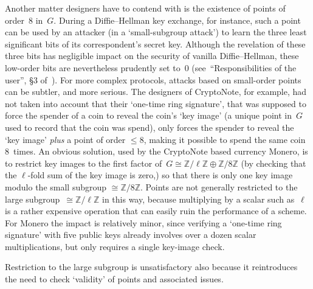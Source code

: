 \documentclass{amsproc}
\newcommand{\Z}{\mathbb{Z}}
\begin{document}
Another matter designers have to contend with
is the existence of points of order~$8$ in~$G$.
During a Diffie--Hellman key exchange, for instance,
such a point can be used by an attacker
(in a `small-subgroup attack')
to learn the three least significant
bits of its correspondent's secret key.
Although the revelation of these three bits has
negligible impact on the security of vanilla Diffie--Hellman,
these low-order bits are nevertheless prudently set to~$0$
(see~``Responsibilities of the user'', \S3 of~\cite{x25519}).
For more complex protocols,
attacks based on small-order points
can be subtler, and more serious.
The designers of CryptoNote\cite{cryptonote},
for example,
had not taken into account\cite{monero-disclosure,monero-curves-post}
that
their `one-time ring signature',
that was supposed to force the spender of a coin
to reveal the coin's `key image'
(a unique point in~$G$ used to record that the coin was spend),
only forces the spender to reveal
the `key image' \emph{plus} a point of order $\leq 8$,
making it possible to spend the same coin 8~times.
An obvious solution,
used by the CryptoNote based 
currency Monero\cite{monero-fix},
is to restrict
key images
to the first factor of~$G\cong \Z/\ell\Z \oplus \Z/8\Z$
(by checking that the $\ell$-fold sum of the key image is zero,)
so that there is only one key image modulo
the small subgroup $\cong \Z/8\Z$.
Points are not generally restricted to
the large subgroup~$\cong \Z/\ell\Z$ in this way,
because multiplying by a scalar such as~$\ell$
is a rather expensive operation
that can easily ruin the performance of a scheme.
For Monero the impact is relatively minor,
since verifying a `one-time ring signature' with five
public keys already involves over a dozen scalar multiplications,
but only requires a single key-image check.

Restriction to the large subgroup is unsatisfactory
also because it reintroduces 
the need to check `validity' of points
and associated issues.
\end{document}
